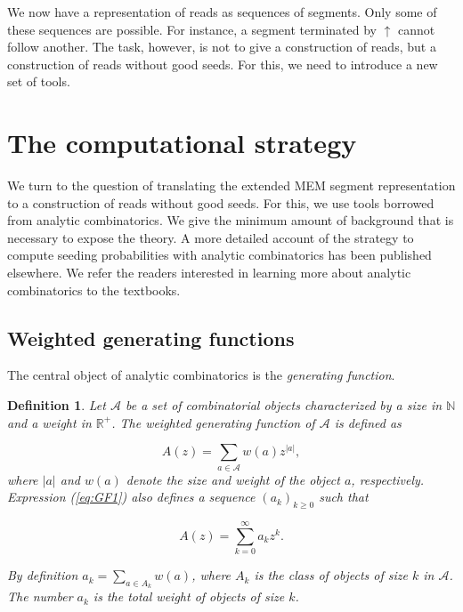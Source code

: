 \documentclass{article}
\newtheorem{definition}{Definition}
\begin{document}
We now have a representation of reads as sequences of segments. Only some
of these sequences are possible. For instance, a segment terminated by
$\uparrow$ cannot follow another. The task, however, is not to give a
construction of reads, but a construction of reads without good seeds. For
this, we need to introduce a new set of tools.


\section{The computational strategy}
\label{sec:symbolic}

We turn to the question of translating the extended MEM segment
representation to a construction of reads without good seeds. For this, we
use tools borrowed from analytic combinatorics. We give the minimum amount
of background that is necessary to expose the theory. A more detailed
account of the strategy to compute seeding probabilities with analytic
combinatorics has been published
elsewhere\cite{filion2017analytic,filion2018analytic}. We refer the
readers interested in learning more about analytic combinatorics to the
textbooks\cite{flajolet2009analytic,sedgewick2013introduction}.


\subsection{Weighted generating functions}

The central object of analytic combinatorics is the \emph{generating
function}.

\begin{definition}
\label{def:GF}
Let $\mathcal{A}$ be a set of combinatorial objects characterized by a
size in $\mathbb{N}$ and a weight in $\mathbb{R}^+$. The weighted
generating function of $\mathcal{A}$ is defined as

\begin{equation}
\label{eq:GF1}
A(z) = \sum_{a \in \mathcal{A}} w(a) z^{|a|},
\end{equation}
where $|a|$ and $w(a)$ denote the size and weight of the object $a$,
respectively. Expression (\ref{eq:GF1}) also defines a sequence $(a_k)_{k
\geq 0}$ such that 

\begin{equation*}
A(z) = \sum_{k=0}^\infty a_k z^k.
\end{equation*}

By definition $a_k = \sum_{a \in A_k}w(a)$, where $A_k$ is the class of
objects of size $k$ in $\mathcal{A}$. The number $a_k$ is the
total weight of objects of size $k$.
\end{definition}
\end{document}
